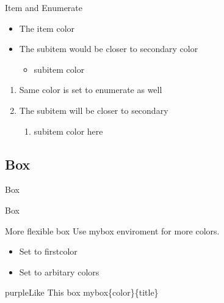 \documentclass[pdf]{beamer}
\begin{document}
\begin{frame}{Item and Enumerate}

    \begin{itemize}
        \item The item color 
        \item The subitem would be closer to secondary color
        \begin{itemize}
            \item subitem color 
        \end{itemize}
        
    \end{itemize}
    
    \begin{enumerate}
        \item Same color is set to enumerate as well
        \item The subitem will be closer to secondary
        \begin{enumerate}
            \item subitem color here
        \end{enumerate}
        
    \end{enumerate}
    
\end{frame}

\subsection{Box}

\begin{frame}{Box}


\end{frame}

\begin{frame}{Box}
    
\begin{mybox}{\firstcolor}{More flexible box}
Use mybox enviroment for more colors.
\begin{itemize}
    \item Set to firstcolor
    \item Set to arbitary colors
\end{itemize}
\end{mybox}

\begin{mybox}{purple}{Like This box}
mybox\{color\}\{title\}
\end{mybox}
    
\end{frame}
\end{document}
